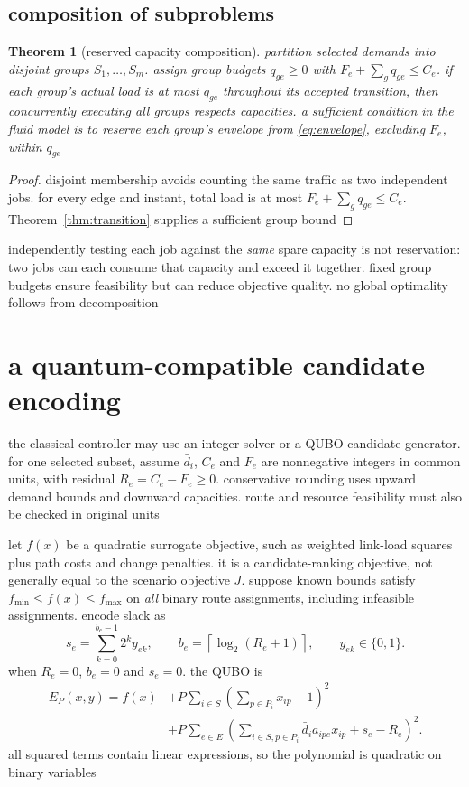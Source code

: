 \documentclass[11pt,a4paper]{article}
\newtheorem{theorem}{Theorem}
\newcommand{\1}{\mathbf{1}}
\begin{document}
\subsection{composition of subproblems}
\begin{theorem}[reserved capacity composition]\label{thm:composition}
partition selected demands into disjoint groups $S_1,\ldots,S_m$. assign group budgets $q_{ge}\ge0$ with $F_e+\sum_gq_{ge}\le C_e$. if each group's actual load is at most $q_{ge}$ throughout its accepted transition, then concurrently executing all groups respects capacities. a sufficient condition in the fluid model is to reserve each group's envelope from \eqref{eq:envelope}, excluding $F_e$, within $q_{ge}$
\end{theorem}
\begin{proof}
disjoint membership avoids counting the same traffic as two independent jobs. for every edge and instant, total load is at most $F_e+\sum_gq_{ge}\le C_e$. Theorem~\ref{thm:transition} supplies a sufficient group bound
\end{proof}
independently testing each job against the \emph{same} spare capacity is not reservation: two jobs can each consume that capacity and exceed it together. fixed group budgets ensure feasibility but can reduce objective quality. no global optimality follows from decomposition

\section{a quantum-compatible candidate encoding}
the classical controller may use an integer solver or a QUBO candidate generator. for one selected subset, assume $\bar d_i$, $C_e$ and $F_e$ are nonnegative integers in common units, with residual $R_e=C_e-F_e\ge0$. conservative rounding uses upward demand bounds and downward capacities. route and resource feasibility must also be checked in original units

let $f(x)$ be a quadratic surrogate objective, such as weighted link-load squares plus path costs and change penalties. it is a candidate-ranking objective, not generally equal to the scenario objective $J$. suppose known bounds satisfy $f_{\min}\le f(x)\le f_{\max}$ on \emph{all} binary route assignments, including infeasible assignments. encode slack as
\begin{equation}
 s_e=\sum_{k=0}^{b_e-1}2^k y_{ek},\qquad
 b_e=\left\lceil\log_2(R_e+1)\right\rceil,\qquad y_{ek}\in\{0,1\}.\label{eq:slack}
\end{equation}
when $R_e=0$, $b_e=0$ and $s_e=0$. the QUBO is
\begin{align}
 E_P(x,y)=f(x)&+P\sum_{i\in S}\left(\sum_{p\in P_i}x_{ip}-1\right)^2\nonumber\\
 &+P\sum_{e\in E}\left(\sum_{i\in S,p\in P_i}\bar d_i a_{ipe}x_{ip}+s_e-R_e\right)^2.\label{eq:qubo}
\end{align}
all squared terms contain linear expressions, so the polynomial is quadratic on binary variables
\end{document}

